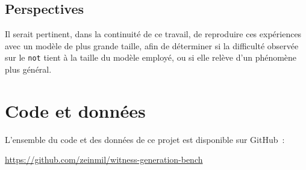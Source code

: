 \documentclass[11pt,a4paper]{article}
\begin{document}
\subsection*{Perspectives}

Il serait pertinent, dans la continuité de ce travail, de reproduire ces expériences avec un modèle de plus grande taille, afin de déterminer si la difficulté observée sur le \texttt{not} tient à la taille du modèle employé, ou si elle relève d'un phénomène plus général.

\section*{Code et données}

L'ensemble du code et des données de ce projet est disponible sur GitHub~:
\begin{center}
\url{https://github.com/zeinmil/witness-generation-bench}
\end{center}
\end{document}
